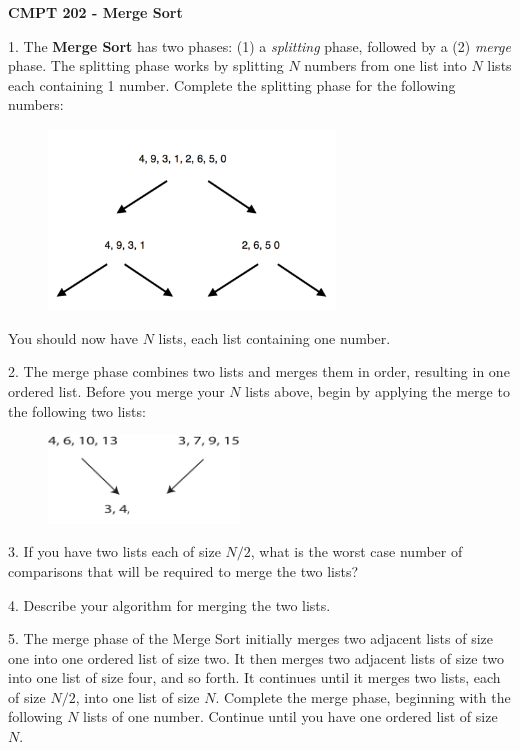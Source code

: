 \documentclass[11pt]{article}
\begin{document}
{\large {\bf CMPT 202 - Merge Sort}} 

1. The {\bf Merge Sort} has two phases: (1) a {\it splitting} phase, followed by a (2) {\it merge} phase. The splitting phase works by splitting $N$ numbers from one list into $N$ lists each containing 1 number. Complete the splitting phase for the following numbers:

\begin{figure}[h]
\centerline {
\includegraphics[width=3in]{ms-1.png}
}
\end{figure}

\vspace*{1in}

You should now have $N$ lists, each list containing one number.

2. The merge phase combines two lists and merges them in order, resulting in one ordered list. Before you merge your $N$ lists above, begin by applying the merge to the following two lists:

\begin{figure}[h]
\centerline {
\includegraphics[width=2in]{merge-1.pdf}
}
\end{figure}


3. If you have two lists each of size $N/2$, what is the worst case number of comparisons that will be required to merge the two lists? 

4. Describe your algorithm for merging the two lists.

\newpage

5. The merge phase of the Merge Sort initially merges two adjacent lists of size one into one ordered list of size two. It then merges two adjacent lists of size two  into one list of size four, and so forth. It continues until it merges two lists, each of size $N/2$, into one list of size $N$. Complete the merge phase, beginning  with the following $N$ lists of one number. Continue until you have one ordered list of size $N$.
\end{document}
